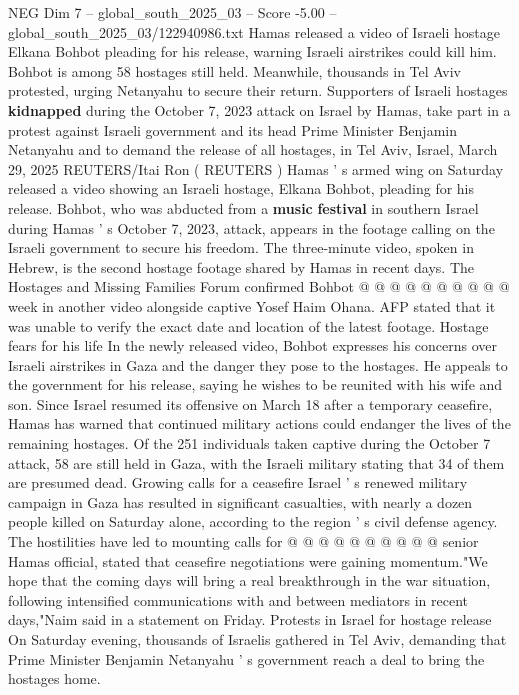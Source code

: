\begin{textsample}{NEG Dim 7 – global\_south\_2025\_03 – Score -5.00 – global\_south\_2025\_03/122940986.txt}  \label{ex:f7_neg_352}
Hamas released a video of Israeli hostage Elkana Bohbot pleading for his release, warning Israeli airstrikes could kill him.
Bohbot is among 58 hostages still held.
Meanwhile, thousands in Tel Aviv protested, urging Netanyahu to secure their return.
Supporters of Israeli hostages \textbf{kidnapped} during the October 7, 2023 attack on Israel by Hamas, take part in a protest against Israeli government and its head Prime Minister Benjamin Netanyahu and to demand the release of all hostages, in Tel Aviv, Israel, March 29, 2025 REUTERS/Itai Ron ( REUTERS ) Hamas ' s armed wing on Saturday released a video showing an Israeli hostage, Elkana Bohbot, pleading for his release.
Bohbot, who was abducted from a \textbf{music} \textbf{festival} in southern Israel during Hamas ' s October 7, 2023, attack, appears in the footage calling on the Israeli government to secure his freedom.
The three-minute video, spoken in Hebrew, is the second hostage footage shared by Hamas in recent days.
The Hostages and Missing Families Forum confirmed Bohbot @ @ @ @ @ @ @ @ @ @ week in another video alongside captive Yosef Haim Ohana.
AFP stated that it was unable to verify the exact date and location of the latest footage.
Hostage fears for his life In the newly released video, Bohbot expresses his concerns over Israeli airstrikes in Gaza and the danger they pose to the hostages.
He appeals to the government for his release, saying he wishes to be reunited with his wife and son.
Since Israel resumed its offensive on March 18 after a temporary ceasefire, Hamas has warned that continued military actions could endanger the lives of the remaining hostages.
Of the 251 individuals taken captive during the October 7 attack, 58 are still held in Gaza, with the Israeli military stating that 34 of them are presumed dead.
Growing calls for a ceasefire Israel ' s renewed military campaign in Gaza has resulted in significant casualties, with nearly a dozen people killed on Saturday alone, according to the region ' s civil defense agency.
The hostilities have led to mounting calls for @ @ @ @ @ @ @ @ @ @ senior Hamas official, stated that ceasefire negotiations were gaining momentum."We hope that the coming days will bring a real breakthrough in the war situation, following intensified communications with and between mediators in recent days,"Naim said in a statement on Friday.
Protests in Israel for hostage release On Saturday evening, thousands of Israelis gathered in Tel Aviv, demanding that Prime Minister Benjamin Netanyahu ' s government reach a deal to bring the hostages home.

\end{textsample}
